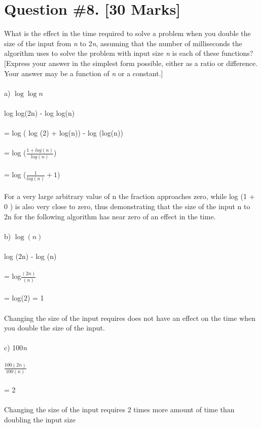 \documentclass{article}
\begin{document}
{\section{Question \#8. [30 Marks]}
What is the effect in the time required to solve a problem when you double the size of the input from \emph{n} to 2\emph{n}, assuming that the number of milliseconds the algorithm uses to solve the problem with input size \emph{n} is each of these functions? [Express your answer in the simplest form possible, either as a ratio or difference. Your answer may be a function of \emph{n} or a constant.] \\ \\  
a) $\log\log{n}$ \\ \\ 
log log(2n) - log log(n) \\ \\ 
= log ( log (2) + log(n)) - log (log(n))  \\ \\ 
= log ($\frac{1 + log(n)}{log(n)}$) \\\\
= log ($\frac{1}{log(n)} + 1$) \\\\
For a very large arbitrary value of n the fraction approaches zero, while log (1 + 0 ) is also very close to zero, thus demonstrating that the size of the input n to 2n for the following algorithm has near zero of an effect in the time. \\\\
b) $\log(n)$ \\ \\ 
log (2n) - log (n)\\\\
= log$\frac{(2n)}{(n)}$\\ \\
= log(2) = 1 \\\\
Changing the size of the input requires does not have an effect on the time when you double the size of the input. \\\\ 
c) 100\emph{n} \\ \\ 
$\frac {100(2n)}{100(n)}$ \\\\
= 2 \\\\
Changing the size of the input requires 2 times more amount of time than doubling the input size  \\\\
}
\end{document}
